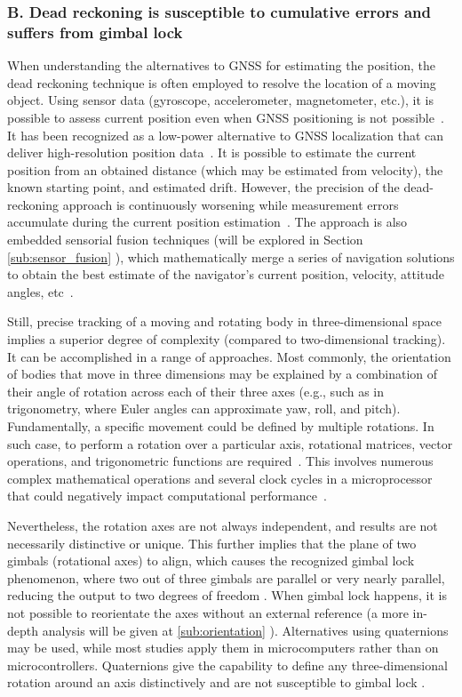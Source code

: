 \subsubsection{B. Dead reckoning is susceptible to cumulative errors and suffers from gimbal lock} %
When understanding the alternatives to GNSS for estimating the position, the dead reckoning technique is often employed to resolve the location of a moving object. Using sensor data (gyroscope, accelerometer, magnetometer, etc.), it is possible to assess current position even when GNSS positioning is not possible~\cite{omar2016integration}. It has been recognized as a low-power alternative to GNSS localization that can deliver high-resolution position data~\cite{dewhirst2016improving}. It is possible to estimate the current position from an obtained distance (which may be estimated from velocity), the known starting point, and estimated drift. However, the precision of the dead-reckoning approach is continuously worsening while measurement errors accumulate during the current position estimation~\cite{kao1991integration}. The approach is also embedded sensorial fusion techniques (will be explored in Section \ref{sub:sensor_fusion} ), which mathematically merge a series of navigation solutions to obtain the best estimate of the navigator's current position, velocity, attitude angles, etc~\cite{krakiwsky1988kalman}.

Still, precise tracking of a moving and rotating body in three-dimensional space implies a superior degree of complexity (compared to two-dimensional tracking). It can be accomplished in a range of approaches. Most commonly, the orientation of bodies that move in three dimensions may be explained by a combination of their angle of rotation across each of their three axes (e.g., such as in trigonometry, where Euler angles can approximate yaw, roll, and pitch). Fundamentally, a specific movement could be defined by multiple rotations. In such case, to perform a rotation over a particular axis, rotational matrices, vector operations, and trigonometric functions are required~\cite{bojanczyk1991computation}. This involves numerous complex mathematical operations and several clock cycles in a microprocessor that could negatively impact computational performance~\cite{janota2015improving}.

Nevertheless, the rotation axes are not always independent, and results are not necessarily distinctive or unique. This further implies that the plane of two gimbals (rotational axes) to align, which causes the recognized gimbal lock phenomenon, where two out of three gimbals are parallel or very nearly parallel, reducing the output to two degrees of freedom \cite{hemingway2018perspectives}. When gimbal lock happens, it is not possible to reorientate the axes without an external reference (a more in-depth analysis will be given at \ref{sub:orientation} ).
Alternatives using quaternions may be used, while most studies apply them in microcomputers rather than on microcontrollers. Quaternions give the capability to define any three-dimensional rotation around an axis distinctively and are not susceptible to gimbal lock \cite{alaimo2013comparison}.

